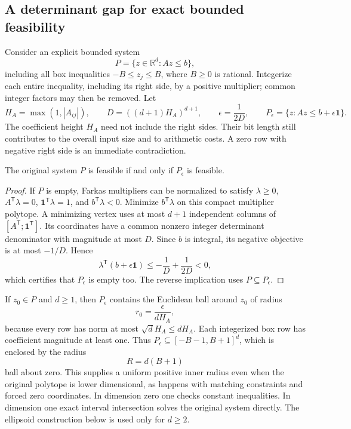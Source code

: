 \subsection{A determinant gap for exact bounded feasibility}

Consider an explicit bounded system
\[
 P=\{z\in\mathbb R^d:Az\le b\},
\]
including all box inequalities $-B\le z_j\le B$, where $B\ge0$ is rational.
Integerize each entire inequality, including its right side, by a positive
multiplier; common integer factors may then be removed.  Let
\[
 H_A=\max(1,|A_{ij}|),\qquad
 D=((d+1)H_A)^{d+1},\qquad \epsilon=\frac1{2D},
 \qquad P_\epsilon=\{z:Az\le b+\epsilon\mathbf1\}.
\]
The coefficient height $H_A$ need not include the right sides.  Their bit
length still contributes to the overall input size and to arithmetic costs.
A zero row with negative right side is an immediate contradiction.

\begin{proposition}
The original system $P$ is feasible if and only if $P_\epsilon$ is feasible.
\end{proposition}
\begin{proof}
If $P$ is empty, Farkas multipliers can be normalized to satisfy
$\lambda\ge0$, $A^{\mathsf T}\lambda=0$, $\mathbf1^{\mathsf T}\lambda=1$,
and $b^{\mathsf T}\lambda<0$.  Minimize $b^{\mathsf T}\lambda$ on this
compact multiplier polytope.  A minimizing vertex uses at most $d+1$
independent columns of $[A^{\mathsf T};\mathbf1^{\mathsf T}]$.  Its
coordinates have a common nonzero integer determinant denominator with
magnitude at most $D$.  Since $b$ is integral, its negative objective is
at most $-1/D$.  Hence
\[
 \lambda^{\mathsf T}(b+\epsilon\mathbf1)
 \le-\frac1D+\frac1{2D}<0,
\]
which certifies that $P_\epsilon$ is empty too.  The reverse implication
uses $P\subseteq P_\epsilon$.
\end{proof}

If $z_0\in P$ and $d\ge1$, then $P_\epsilon$ contains the Euclidean ball
around $z_0$ of radius
\[
 r_0=\frac{\epsilon}{dH_A},
\]
because every row has norm at most $\sqrt d H_A\le dH_A$.  Each integerized
box row has coefficient magnitude at least one.  Thus
$P_\epsilon\subseteq[-B-1,B+1]^d$, which is enclosed by the radius
\[
 R=d(B+1)
\]
ball about zero.  This supplies a uniform positive inner radius even when
the original polytope is lower dimensional, as happens with matching
constraints and forced zero coordinates.  In dimension zero one checks
constant inequalities.  In dimension one exact interval intersection
solves the original system directly.  The ellipsoid construction below
is used only for $d\ge2$.

